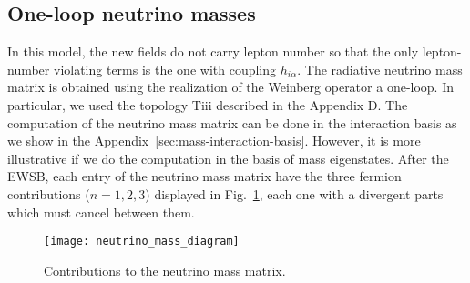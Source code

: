 %
%

\subsection{One-loop neutrino masses}

In this model, the new fields do not carry lepton number so that the
only lepton-number violating terms is the one with coupling $h_{i\alpha}$. The radiative neutrino mass matrix is obtained 
using the realization of the Weinberg operator a one-loop. In particular, we used the topology {\color{red}Tiii} described in the {\color{red}Appendix D}. 
The computation of the neutrino mass matrix can be done in the interaction basis as we show in the Appendix~\ref{sec:mass-interaction-basis}.
However, it is more illustrative if we do the computation in the basis of mass eigenstates. After the EWSB, each entry of the neutrino mass matrix have the three fermion contributions ($n=1,2,3$) displayed in Fig.~\ref{fig:T13Aweylme}, each one with a divergent parts which must cancel between them.  
\begin{figure}
  \centering
  \texttt{[image: neutrino\_mass\_diagram]}
  \caption{Contributions to the neutrino mass matrix.}
  \label{fig:T13Aweylme}
\end{figure}

